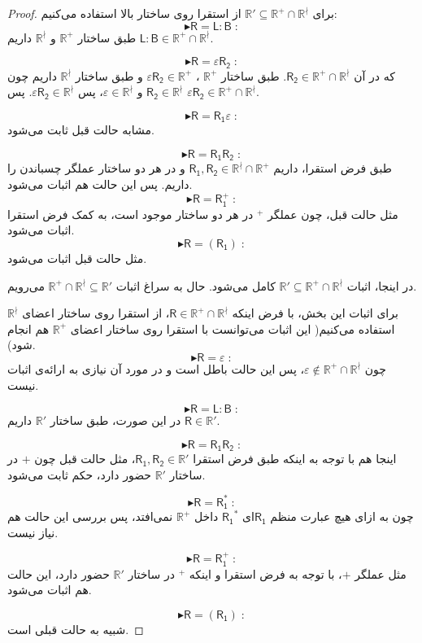 \begin{proof}
	برای 
	$\mathbb{R' \subseteq R^+ \cap R^\nmid}$
	از استقرا روی ساختار بالا استفاده می‌کنیم:
	$$\blacktriangleright \mathsf{R=L:B}\;:$$
	طبق ساختار  $\mathbb{R^+}$ و $\mathbb{R^\nmid}$ داریم
	$\mathsf{L:B} \in \mathbb{R^+ \cap R^\nmid}$.

	$$\blacktriangleright \mathsf{R=\varepsilon R_2}\;:$$
	که در آن 
	$\mathsf{R_2} \in \mathbb{R^+ \cap R^\nmid}$.
	طبق ساختار $\mathbb{R^+}$ ،	$\varepsilon\mathsf{R_2} \in \mathbb{R^+}$ و طبق ساختار $\mathbb{R^\nmid}$ داریم چون 
	$\mathsf{R_2} \in \mathbb{R^\nmid}$
	و
	$\varepsilon \in \mathbb{R^\nmid}$،
	پس 
	$\mathsf{\varepsilon R_2} \in \mathbb{R^\nmid}$.
	پس
	$\mathsf{\varepsilon R_2} \in \mathbb{R^+ \cap R^\nmid}$.
	
	$$\blacktriangleright \mathsf{R=R_1 \varepsilon}\;:$$
	مشابه حالت قبل ثابت می‌شود.
	
	$$\blacktriangleright \mathsf{R=R_1 R_2}\;:$$
	طبق فرض استقرا، داریم 
	$\mathsf{R_1,R_2} \in \mathbb{R^\nmid \cap R^+}$ 
	و در هر دو ساختار عملگر چسباندن را داریم. پس این حالت هم اثبات می‌شود.
	$$\blacktriangleright \mathsf{R=R_1^+}\;:$$
	مثل حالت قبل، چون عملگر $ ^+$ در هر دو ساختار موجود است، به کمک فرض استقرا اثبات می‌شود.
	$$\blacktriangleright \mathsf{R=(R_1)}\;:$$
	مثل حالت قبل اثبات می‌شود.
	
	در اینجا، اثبات 
	$\mathbb{R' \subseteq R^+ \cap R^\nmid}$ 
	کامل می‌شود. حال به سراغ اثبات 
	$\mathbb{R^+ \cap R^\nmid \subseteq R'}$
	می‌رویم.
	
	برای اثبات این بخش، با فرض اینکه 
	$\mathsf{R} \in \mathbb{R^+ \cap R^\nmid}$،
	از استقرا روی ساختار اعضای $\mathbb{R^\nmid}$ استفاده می‌کنیم( این اثبات می‌توانست با استقرا روی ساختار اعضای $\mathbb{R^+}$ هم انجام شود).
	$$\blacktriangleright \mathsf{R=\varepsilon}\;:$$
	چون $\varepsilon \notin \mathbb{R^+ \cap R^\nmid}$، پس این حالت باطل است و در مورد آن نیازی به ارائه‌ی اثبات نیست.
	
	
	$$\blacktriangleright \mathsf{R=L:B}\;:$$
	در این صورت، طبق ساختار $\mathbb{R'}$ داریم  
	$\mathsf{R} \in \mathbb{R'}$.
	
	$$\blacktriangleright \mathsf{R=R_1 R_2}\;:$$
	اینجا هم با توجه به اینکه طبق فرض استقرا 
	$\mathsf{R_1 , R_2} \in \mathbb{R'}$،
	مثل حالت قبل چون $+$ در ساختار $\mathbb{R'}$ حضور دارد، حکم ثابت می‌شود.
	
	$$\blacktriangleright \mathsf{R=R_1^*}\;:$$
	چون به ازای هیچ عبارت منظم $\mathsf{R_1}$ای 
	$\mathsf{R_1}^*$ داخل $\mathbb{R^+}$ نمی‌افتد، پس بررسی این حالت هم نیاز نیست.
	
	
	$$\blacktriangleright \mathsf{R=R_1^+}\;:$$
	مثل عملگر $+$، با توجه به فرض استقرا و اینکه $ ^+$ در ساختار $\mathbb{R'}$ حضور دارد، این حالت هم اثبات می‌شود.
	
	
	$$\blacktriangleright \mathsf{R=(R_1)}\;:$$
	شبیه به حالت قبلی است.
	
	
	
	
	
	
	
\end{proof}





